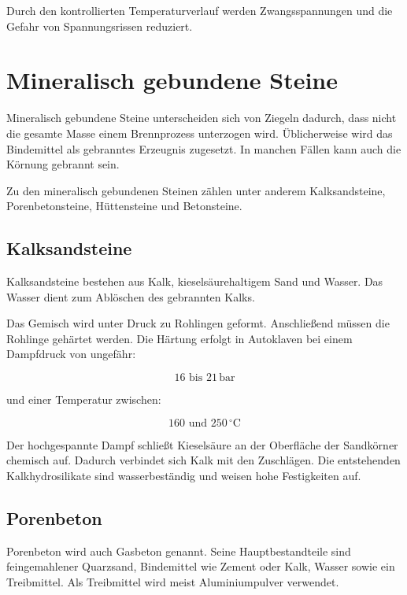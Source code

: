 \documentclass[
  12pt,
  a4paper,
  oneside
]{scrreprt}
\begin{document}
Durch den kontrollierten Temperaturverlauf werden Zwangsspannungen und
die Gefahr von Spannungsrissen reduziert.


\section{Mineralisch gebundene Steine}

Mineralisch gebundene Steine unterscheiden sich von Ziegeln dadurch,
dass nicht die gesamte Masse einem Brennprozess unterzogen wird.
Üblicherweise wird das Bindemittel als gebranntes Erzeugnis zugesetzt.
In manchen Fällen kann auch die Körnung gebrannt sein.


Zu den mineralisch gebundenen Steinen zählen unter anderem
Kalksandsteine, Porenbetonsteine, Hüttensteine und Betonsteine.


\subsection{Kalksandsteine}

Kalksandsteine bestehen aus Kalk, kieselsäurehaltigem Sand und Wasser.
Das Wasser dient zum Ablöschen des gebrannten Kalks.


Das Gemisch wird unter Druck zu Rohlingen geformt. Anschließend müssen
die Rohlinge gehärtet werden. Die Härtung erfolgt in Autoklaven bei
einem Dampfdruck von ungefähr:

\begin{equation}
  16 \text{ bis } 21\,\mathrm{bar}
\end{equation}

und einer Temperatur zwischen:

\begin{equation}
  160 \text{ und } 250\,^\circ\mathrm{C}
\end{equation}



Der hochgespannte Dampf schließt Kieselsäure an der Oberfläche der
Sandkörner chemisch auf. Dadurch verbindet sich Kalk mit den
Zuschlägen. Die entstehenden Kalkhydrosilikate sind wasserbeständig und
weisen hohe Festigkeiten auf.


\subsection{Porenbeton}

Porenbeton wird auch Gasbeton genannt. Seine Hauptbestandteile sind
feingemahlener Quarzsand, Bindemittel wie Zement oder Kalk, Wasser sowie
ein Treibmittel. Als Treibmittel wird meist Aluminiumpulver verwendet.
\end{document}
